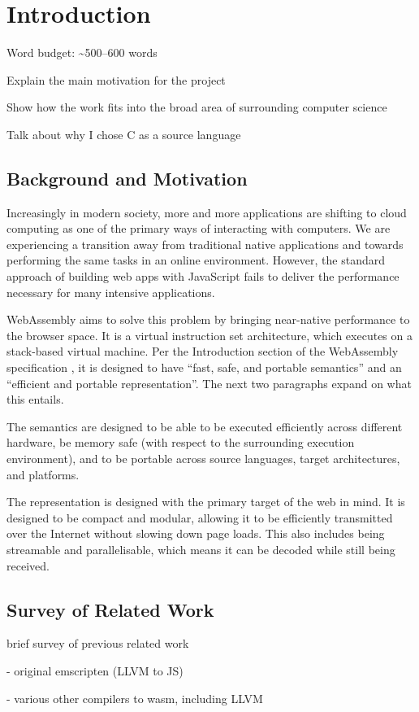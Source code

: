 \documentclass[00-main.tex]{subfiles}
\begin{document}
\chapter{Introduction}

\begin{Comment}
Word budget: \textasciitilde 500--600 words
\end{Comment}

\begin{Comment}
Explain the main motivation for the project

Show how the work fits into the broad area of surrounding computer science
\end{Comment}

\begin{Comment}
Talk about why I chose C as a source language
\end{Comment}

\section{Background and Motivation}

Increasingly in modern society, more and more applications are shifting to cloud computing as one of the primary ways of interacting with computers.
We are experiencing a transition away from traditional native applications and towards performing the same tasks in an online environment.
However, the standard approach of building web apps with JavaScript fails to deliver the performance necessary for many intensive applications.

WebAssembly aims to solve this problem by bringing near-native performance to the browser space.
It is a virtual instruction set architecture, which executes on a stack-based virtual machine.
Per the Introduction section of the WebAssembly specification , it is designed to have ``fast, safe, and portable semantics'' and an ``efficient and portable representation''.
The next two paragraphs expand on what this entails.

The semantics are designed to be able to be executed efficiently across different hardware, be memory safe (with respect to the surrounding execution environment), and to be portable across source languages, target architectures, and platforms.

The representation is designed with the primary target of the web in mind.
It is designed to be compact and modular, allowing it to be efficiently transmitted over the Internet without slowing down page loads.
This also includes being streamable and parallelisable, which means it can be decoded while still being received.



\section{Survey of Related Work}

\begin{Comment}
brief survey of previous related work

- original emscripten (LLVM to JS)

- various other compilers to wasm, including LLVM
\end{Comment}
\end{document}
